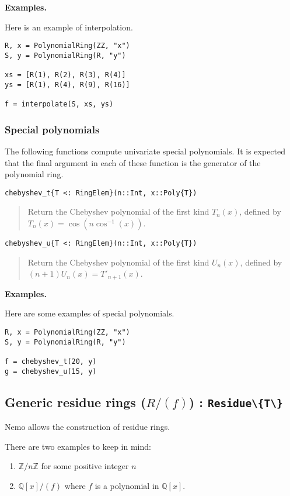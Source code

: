 \documentclass[a4paper,10pt]{article}
\newcommand{\Z}{\mathbb{Z}}
\newcommand{\Q}{\mathbb{Q}}
\newcommand{\code}{\lstinline}
\newcommand{\desc}[1]{\vspace{-3mm}\begin{quote}#1\end{quote}}
\begin{document}
\textbf{Examples.}

Here is an example of interpolation.

\begin{lstlisting}
R, x = PolynomialRing(ZZ, "x")
S, y = PolynomialRing(R, "y")

xs = [R(1), R(2), R(3), R(4)]
ys = [R(1), R(4), R(9), R(16)]

f = interpolate(S, xs, ys)
\end{lstlisting}
 
\subsubsection{Special polynomials}

The following functions compute univariate special polynomials. It is expected
that the final argument in each of these function is the generator of the polynomial ring.

\begin{lstlisting}
chebyshev_t{T <: RingElem}(n::Int, x::Poly{T})
\end{lstlisting}

\desc{Return the Chebyshev polynomial of the first kind $T_n(x)$, defined by 
$T_n(x) = \cos(n \cos^{-1}(x))$.}

\begin{lstlisting}
chebyshev_u{T <: RingElem}(n::Int, x::Poly{T})
\end{lstlisting}

\desc{Return the Chebyshev polynomial of the first kind $U_n(x)$, defined by 
$(n+1) U_n(x) = T'_{n+1}(x)$.}

\textbf{Examples.}

Here are some examples of special polynomials.

\begin{lstlisting}
R, x = PolynomialRing(ZZ, "x")
S, y = PolynomialRing(R, "y")

f = chebyshev_t(20, y)
g = chebyshev_u(15, y)
\end{lstlisting}

\subsection{Generic residue rings ($R/(f)$) : \code|Residue\{T\}|}

Nemo allows the construction of residue rings. 

There are two examples to keep in mind:

\begin{enumerate}
\item $\Z/n\Z$ for some positive integer $n$

\item $\Q[x]/(f)$ where $f$ is a polynomial in $\Q[x]$.
\end{enumerate}
\end{document}
